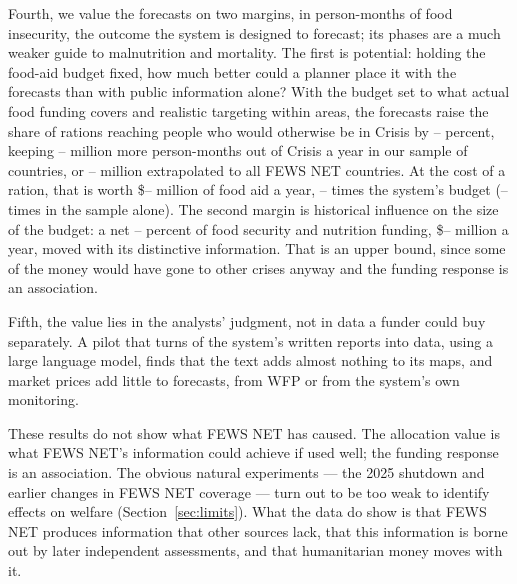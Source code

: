 \documentclass[11pt]{article}
\begin{document}
Fourth, we value the forecasts on two margins, in person-months of food insecurity, the outcome the system is designed to forecast; its phases are a much weaker guide to malnutrition and mortality. The first is potential: holding the food-aid budget fixed, how much better could a planner place it with the forecasts than with public information alone? With the budget set to what actual food funding covers and realistic targeting within areas, the forecasts raise the share of rations reaching people who would otherwise be in Crisis by \vmHalfPctMore{}--\vmRandPctMore{} percent, keeping \vmHalfGain{}--\vmRandGain{} million more person-months out of Crisis a year in our sample of \vmCountries{} countries, or \vmHalfGainAll{}--\vmRandGainAll{} million extrapolated to all FEWS NET countries. At the cost of a ration, that is worth \$\vmHalfAidAll{}--\vmRandAidAll{} million of food aid a year, \vmHalfRatioAll{}--\vmRandRatioAll{} times the system's budget (\vmHalfRatio{}--\vmRandRatio{} times in the sample alone). The second margin is historical influence on the size of the budget: a net \envShareIpc{}--\envShareRaw{} percent of food security and nutrition funding, \$\envUsdLo{}--\envUsdHi{} million a year, moved with its distinctive information. That is an upper bound, since some of the money would have gone to other crises anyway and the funding response is an association.

Fifth, the value lies in the analysts' judgment, not in data a funder could buy separately. A pilot that turns \txtReports{} of the system's written reports into data, using a large language model, finds that the text adds almost nothing to its maps, and market prices add little to forecasts, from WFP or from the system's own monitoring.

These results do not show what FEWS NET has caused. The allocation value is what FEWS NET's information could achieve if used well; the funding response is an association. The obvious natural experiments --- the 2025 shutdown and earlier changes in FEWS NET coverage --- turn out to be too weak to identify effects on welfare (Section~\ref{sec:limits}). What the data do show is that FEWS NET produces information that other sources lack, that this information is borne out by later independent assessments, and that humanitarian money moves with it.
\end{document}
